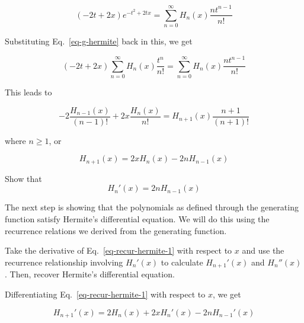 \begin{equation}
(-2t+2x)e^{-t^2 + 2tx} = \sum_{n = 0}^{\infty} H_n(x) \frac{nt^{n-1}}{n!}
\end{equation} 

Substituting Eq.~\ref{eq-g-hermite} back in this, we get

\begin{equation}
(-2t+2x) \sum_{n = 0}^{\infty} H_n(x)\frac{t^n}{n!} = \sum_{n = 0}^{\infty} H_n(x) \frac{nt^{n-1}}{n!}
\end{equation} 

\noindent{}This leads to

\begin{equation}
-2  \frac{H_{n-1}(x)}{(n-1)!} + 2 x \frac{H_n(x)}{n!} = H_{n+1}(x) \frac{n+1}{(n+1)!}
\end{equation} 

where $n \geq 1$, or

\begin{equation}
H_{n+1}(x) = 2 x H_n(x) - 2 n H_{n-1}(x)
\label{eq-recur-hermite-1}
\end{equation} 
 

\begin{exer}
Show that
$$\displaystyle H_n'(x) = 2nH_{n-1}(x)$$ \label{eq-recur-hermite-2}
\end{exer}


\pagebreak


The next step is showing that the polynomials as defined through the generating function satisfy Hermite's differential equation. We will do this using the recurrence relations we derived from the generating function.

\begin{cue}
Take the derivative of Eq.~\ref{eq-recur-hermite-1} with respect to $x$ and use the recurrence relationship involving $H_n'(x)$ to calculate  $H_{n+1}'(x)$ and $H_n''(x)$. Then, recover Hermite's differential equation.
\end{cue}

Differentiating Eq.~\ref{eq-recur-hermite-1} with respect to $x$, we get

\begin{equation}
H_{n+1}'(x) = 2  H_n(x) + 2 x H_n'(x)- 2 n H_{n-1}'(x)
\end{equation} 

